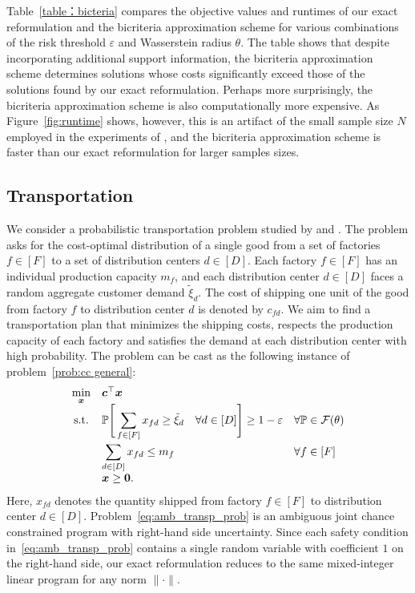 \documentclass[nonblindrev]{informs2017}
\newcommand{\1}[1]{\mathds{1}{\left(#1\right)}}
\begin{document}
Table~\ref{table：bicteria} compares the objective values and runtimes of our exact reformulation and the bicriteria approximation scheme for various combinations of the risk threshold $\varepsilon$ and Wasserstein radius $\theta$. The table shows that despite incorporating additional support information, the bicriteria approximation scheme determines solutions whose costs significantly exceed those of the solutions found by our exact reformulation. Perhaps more surprisingly, the bicriteria approximation scheme is also computationally more expensive. As Figure~\ref{fig:runtime} shows, however, this is an artifact of the small sample size $N$ employed in the experiments of \cite{xie2018bicriteria}, and the bicriteria approximation scheme is faster than our exact reformulation for larger samples sizes.

\subsection{Transportation}\label{sec:transportation}
We consider a probabilistic transportation problem studied by \cite{luedtke2010} and \cite{yanagisawa:13}. The problem asks for the cost-optimal distribution of a single good from a set of factories $f \in [F]$ to a set of distribution centers $d \in [D]$. Each factory $f \in [F]$ has an individual production capacity $m_f$, and each distribution center $d \in [D]$ faces a random aggregate customer demand $\tilde{\xi}_d$. The cost of shipping one unit of the good from factory $f$ to distribution center $d$ is denoted by $c_{fd}$. We aim to find a transportation plan that minimizes the shipping costs, respects the production capacity of each factory and satisfies the demand at each distribution center with high probability. The problem can be cast as the following instance of problem~\eqref{prob:cc general}:
\begin{equation}\label{eq:amb_transp_prob}
\begin{array}{cl@{\quad}l}
\displaystyle \min_{\bm{x}} & \bm{c}^\top\bm{x} \\
{\rm s.t.} & \displaystyle \mathbb{P} \Bigg[ \sum_{f \in [F]} x_{fd} \geq \tilde{\xi}_d \quad \forall d \in [D] \Bigg] \geq 1 - \varepsilon & \displaystyle \forall \mathbb{P} \in \mathcal{F}(\theta) \\[5mm]
& \displaystyle \sum_{d \in [D]} x_{fd} \leq m_f & \displaystyle \forall f \in [F] \\
& \displaystyle \bm{x} \geq \bm{0}.
\end{array}
\end{equation}
Here, $x_{fd}$ denotes the quantity shipped from factory $f \in [F]$ to distribution center $d \in [D]$. Problem~\eqref{eq:amb_transp_prob} is an ambiguous joint chance constrained program with right-hand side uncertainty. Since each safety condition in~\eqref{eq:amb_transp_prob} contains a single random variable with coefficient $1$ on the right-hand side, our exact reformulation reduces to the same mixed-integer linear program for any norm $\lVert \cdot \rVert$.
\end{document}

